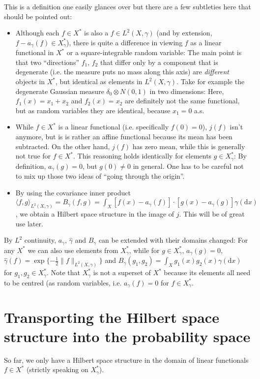 \documentclass{scrartcl}
\theoremstyle{definition}
\theoremstyle{remark}
\newcommand{\de}{\mathrm d}
\begin{document}
This is a definition one easily glances over but there are a few subtleties here that should be pointed out:
\begin{itemize}
\item Although each $f\in X^*$ is also a $f\in L^2(X, \gamma)$ (and by extension, $f-a_\gamma(f)\in X_\gamma^*$), there is quite a difference in viewing $f$ as a linear functional in $X^*$ or a square-integrable random variable: The main point is that two ``directions'' $f_1$, $f_2$ that differ only by a component that is degenerate (i.e. the measure puts no mass along this axis) are \textit{different} objects in $X^*$, but identical as elements in $L^2(X,\gamma)$. Take for example the degenerate Gaussian measure $\delta_0 \otimes N(0,1)$ in two dimensions: Here, $f_1(x) = x_1+x_2$ and $f_2(x) = x_2$ are definitely not the same functional, but as random variables they are identical, because $x_1 = 0$ a.s.
\item While $f\in X^*$ is a linear functional (i.e. specifically $f(0)=0$), $j(f)$ isn't anymore, but is is rather an affine functional because its mean has been subtracted. On the other hand, $j(f)$ has zero mean, while this is generally not true for $f\in X^*$. This reasoning holds identically for elements $g\in X_\gamma^*$: By definition, $a_\gamma(g) = 0$, but $g(0)\neq 0$ in general. One has to be careful not to mix up those two ideas of ``going through the origin''.
\item By using the covariance inner product $\langle f, g\rangle_{L^2(X, \gamma)} = B_\gamma(f, g) = \int_X [f(x) - a_\gamma(f)]\cdot [g(x)-a_\gamma(g)]\gamma(\de x)$, we obtain a Hilbert space structure in the image of $j$. This will be of great use later. 
\end{itemize}

By $L^2$ continuity, $a_\gamma$, $\hat \gamma$ and $B_\gamma$ can be extended with their domains changed: For any $X^*$ we can also use elements from $X_\gamma^*$, while for $g\in X_\gamma^*$, $a_\gamma(g) = 0$, $\hat \gamma(f) = \exp\{-\frac{1}{2}\|f\|_{L^2(X,\gamma)}\}$ and $B_\gamma(g_1, g_2) = \int_X g_1(x)g_2(x)\gamma(\de x)$ for $g_1,g_2\in X_\gamma^*$. Note that $X_\gamma^*$ is not a superset of $X^*$ because its elements all need to be centred (as random variables, i.e. $a_\gamma(f) = 0$ for $f\in X_\gamma^*$.

\section{Transporting the Hilbert space structure into the probability space}
So far, we only have a Hilbert space structure in the domain of linear functionals $f\in X^*$ (strictly speaking on $X_\gamma^*$).
\end{document}
